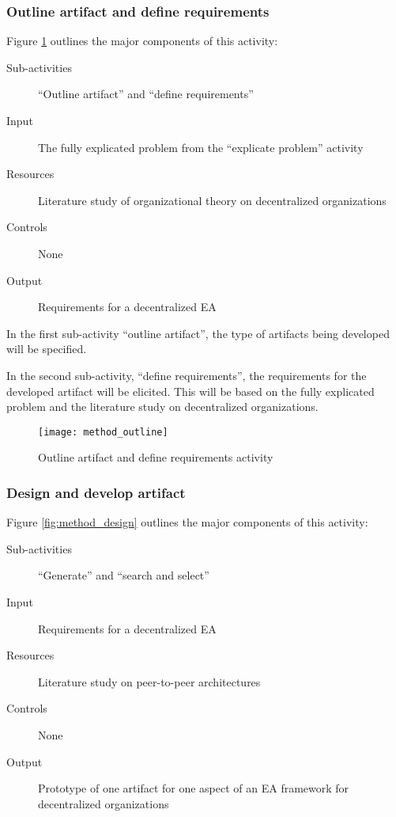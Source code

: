 \subsubsection*{Outline artifact and define requirements}

Figure \ref{fig:method_outline} outlines the major components of this activity:
\begin{description}
  \item[Sub-activities] ``Outline artifact'' and ``define requirements''~\cite[Ch. 6]{johannessonPerjons2012}
  \item[Input] The fully explicated problem from the ``explicate problem'' activity
  \item[Resources] Literature study of organizational theory on decentralized organizations
  \item[Controls] None
  \item[Output] Requirements for a decentralized EA
\end{description}

In the first sub-activity ``outline artifact'', the type of artifacts being developed will be specified. 

In the second sub-activity, ``define requirements'', the requirements for the developed artifact will be elicited. This will be based on the fully explicated problem and the literature study on decentralized organizations.

\begin{figure}
\centering
\texttt{[image: method\_outline]}
\caption{Outline artifact and define requirements activity}
\label{fig:method_outline}
\end{figure}

\subsubsection*{Design and develop artifact}

Figure \ref{fig:method_design} outlines the major components of this activity:
\begin{description}
  \item[Sub-activities] ``Generate'' and ``search and select'' ~\cite[Ch. 7]{johannessonPerjons2012}
  \item[Input]  Requirements for a decentralized EA 
  \item[Resources] Literature study on peer-to-peer architectures
  \item[Controls] None
  \item[Output] Prototype of one artifact for one aspect of an EA framework for decentralized organizations 
\end{description}

